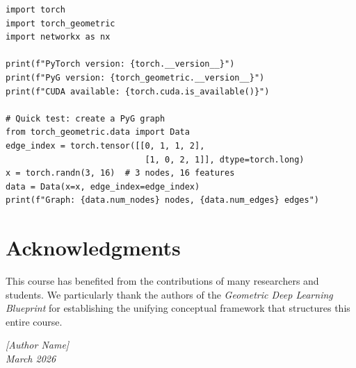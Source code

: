 \begin{codeblock}[title=\textbf{Environment verification}]
\begin{verbatim}
import torch
import torch_geometric
import networkx as nx

print(f"PyTorch version: {torch.__version__}")
print(f"PyG version: {torch_geometric.__version__}")
print(f"CUDA available: {torch.cuda.is_available()}")

# Quick test: create a PyG graph
from torch_geometric.data import Data
edge_index = torch.tensor([[0, 1, 1, 2],
                            [1, 0, 2, 1]], dtype=torch.long)
x = torch.randn(3, 16)  # 3 nodes, 16 features
data = Data(x=x, edge_index=edge_index)
print(f"Graph: {data.num_nodes} nodes, {data.num_edges} edges")
\end{verbatim}
\end{codeblock}

\section*{Acknowledgments}

This course has benefited from the contributions of many researchers and
students. We particularly thank the authors of the \textit{Geometric Deep
Learning Blueprint} for establishing the unifying conceptual framework that
structures this entire course.

\vspace{1cm}
\begin{flushright}
\textit{[Author Name]} \\
\textit{March 2026}
\end{flushright}
